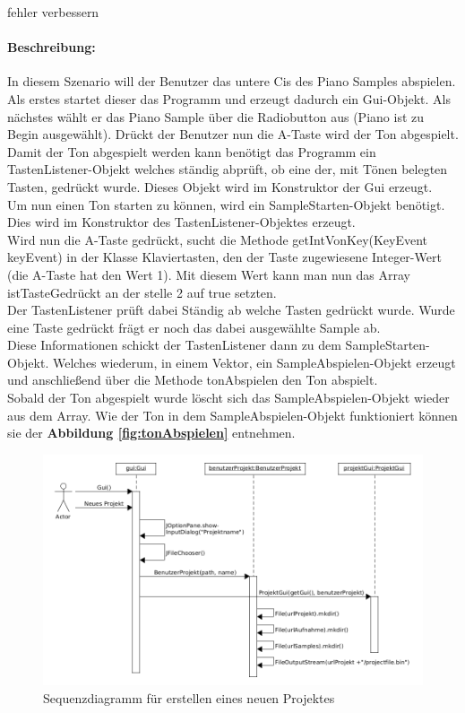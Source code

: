fehler verbessern

\paragraph{Beschreibung:} In diesem Szenario will der Benutzer das untere Cis des Piano Samples 
abspielen. Als erstes startet dieser das Programm und erzeugt dadurch ein Gui-Objekt. Als nächstes 
wählt er das Piano Sample über die Radiobutton aus (Piano ist zu Begin ausgewählt). Drückt der 
Benutzer nun die A-Taste wird der Ton abgespielt.\\
Damit der Ton abgespielt werden kann benötigt das Programm ein TastenListener-Objekt welches 
ständig abprüft, ob eine der, mit Tönen belegten Tasten, gedrückt wurde. Dieses Objekt wird im 
Konstruktor der Gui erzeugt.\\
Um nun einen Ton starten zu können, wird ein SampleStarten-Objekt benötigt. Dies wird im 
Konstruktor des TastenListener-Objektes erzeugt.\\
Wird nun die A-Taste gedrückt, sucht die Methode getIntVonKey(KeyEvent keyEvent) in der Klasse 
Klaviertasten, den der Taste zugewiesene Integer-Wert (die A-Taste hat den Wert 1). Mit diesem Wert 
kann man nun das Array istTasteGedrückt an der stelle 2 auf true setzten.\\
Der TastenListener prüft dabei Ständig ab welche Tasten gedrückt wurde. Wurde eine Taste gedrückt 
frägt er noch das dabei ausgewählte Sample ab.\\
Diese Informationen schickt der TastenListener dann zu dem SampleStarten-Objekt. Welches 
wiederum, in einem Vektor, ein SampleAbspielen-Objekt erzeugt und anschließend über die Methode 
tonAbspielen den Ton abspielt.\\
Sobald der Ton abgespielt wurde löscht sich das SampleAbspielen-Objekt wieder aus dem Array.
Wie der Ton in dem SampleAbspielen-Objekt funktioniert können sie der \textbf{Abbildung 
\ref{fig:tonAbspielen}} entnehmen.


\newpage

\begin{figure}[h]
 \centering
 \includegraphics[width=1\textwidth]{./Bilder/Neues_Projekt.png}
 \caption{Sequenzdiagramm für erstellen eines neuen Projektes} 
\end{figure}

